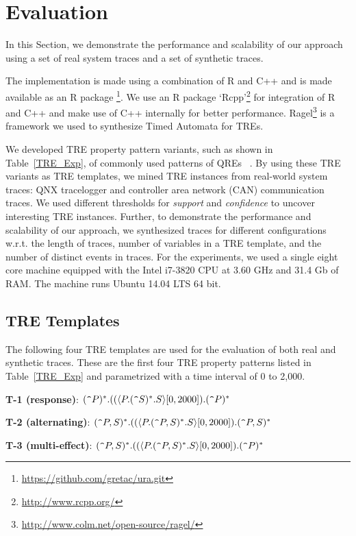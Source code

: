 \documentclass[]{sigplanconf}
\begin{document}
\section{Evaluation}

In this Section, we demonstrate the performance and scalability of our approach using a set of real system traces and a set of synthetic traces.

The implementation is made using a combination of R and C++ and is made available as an R package \footnote{\url{https://github.com/gretac/ura.git}}. We use an R package `Rcpp'\footnote{\url{http://www.rcpp.org/}} for integration of R and C++ and make use of C++ internally for better performance. Ragel\footnote{\url{http://www.colm.net/open-source/ragel/}} is a framework we used to synthesize Timed Automata for TREs.

We developed TRE property pattern variants, such as shown in Table~\ref{TRE_Exp}, of commonly used patterns of QREs ~\cite{DBLP:conf/paste/YangE04}. By using these TRE variants as TRE templates, we mined TRE instances from real-world system traces: QNX tracelogger and controller area network (CAN) communication traces. We used different thresholds for \emph{support} and \emph{confidence} to uncover interesting TRE instances. Further, to demonstrate the performance and scalability of our approach, we synthesized traces for different configurations w.r.t. the length of traces, number of variables in a TRE template, and the number of distinct events in traces. For the experiments, we used a single eight core machine equipped with the Intel i7-3820 CPU at 3.60 GHz and 31.4 Gb of RAM. The machine runs Ubuntu 14.04 LTS 64 bit.

\subsection{TRE Templates}
The following four TRE templates are used for the evaluation of both real and synthetic traces. These are the first four TRE property patterns listed in Table~\ref{TRE_Exp} and parametrized with a time interval of 0 to 2,000.
\vspace{2mm}

\noindent \textbf{T-1 (response)}: $(\verb!^!P)^*.((\langle P.(\verb!^!S)^*.S\rangle[0, 2000]).(\verb!^!P)^*$

\noindent \textbf{T-2 (alternating)}: $(\verb!^!P,S)^*.((\langle P.(\verb!^!P,S)^*.S\rangle[0, 2000]).(\verb!^!P,S)^*$

\noindent \textbf{T-3 (multi-effect)}: $(\verb!^!P,S)^*.((\langle P.(\verb!^!P,S)^*.S\rangle[0, 2000]).(\verb!^!P)^*$
\end{document}
